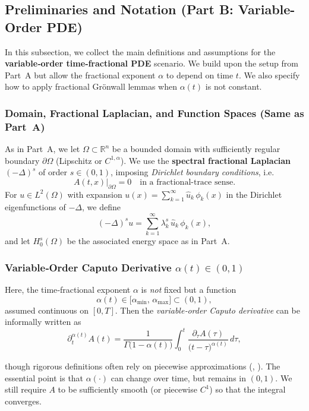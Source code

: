 \documentclass[12pt]{article}
\begin{document}
\subsection{Preliminaries and Notation (Part B: Variable-Order PDE)}
\label{subsec:prelim_partB}

In this subsection, we collect the main definitions and assumptions for 
the \textbf{variable‐order time‐fractional PDE} scenario. We build upon the 
setup from Part~A but allow the fractional exponent \(\alpha\) to depend on time 
\(t\). We also specify how to apply fractional Gr\"onwall lemmas when 
\(\alpha(t)\) is not constant.

\subsubsection{Domain, Fractional Laplacian, and Function Spaces (Same as Part~A)}

As in Part~A, we let \(\Omega\subset \mathbb{R}^n\) be a bounded domain with 
sufficiently regular boundary \(\partial\Omega\) (Lipschitz or \(C^{1,\alpha}\)). 
We use the \textbf{spectral fractional Laplacian} \((- \Delta)^s\) of order 
\(s\in(0,1)\), imposing \emph{Dirichlet boundary conditions}, i.e.\ 
\[
A(t,x)\big|_{\partial\Omega} = 0 
\quad\text{in a fractional‐trace sense.}
\]
For $u\in L^2(\Omega)$ with expansion $u(x)=\sum_{k=1}^\infty \hat{u}_k\,\phi_k(x)$ 
in the Dirichlet eigenfunctions of $-\Delta$, we define
\[
(-\Delta)^s u
=
\sum_{k=1}^\infty \lambda_k^s\,\hat{u}_k\,\phi_k(x),
\]
and let $H_0^s(\Omega)$ be the associated energy space as in Part~A.

\subsubsection{Variable‐Order Caputo Derivative \texorpdfstring{\(\alpha(t)\in(0,1)\)}{}}

Here, the time‐fractional exponent $\alpha$ is \emph{not} fixed but a function 
\[
\alpha(t)\in \bigl[\alpha_{\min},\,\alpha_{\max}\bigr]\subset (0,1),
\]
assumed continuous on $[0,T]$. Then the \emph{variable‐order Caputo derivative} 
can be informally written as
\[
\partial_t^{\alpha(t)} A(t)
=
\frac{1}{\Gamma\bigl(1-\alpha(t)\bigr)}
\int_0^t
  \frac{\partial_\tau A(\tau)}{\bigl(t-\tau\bigr)^{\alpha(t)}}
\,d\tau,
\]

though rigorous definitions often rely on piecewise approximations 
(\cite{Sun2019}, \cite[Ch.~6]{Magin2006}). The essential point is that 
\(\alpha(\cdot)\) can change over time, but remains in \((0,1)\). We still require 
$A$ to be sufficiently smooth (or piecewise $C^1$) so that the integral converges.
\end{document}
